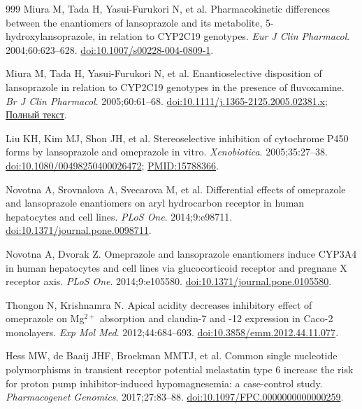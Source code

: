\documentclass[11pt,a4paper,notitlepage]{report}
\begin{document}
\begin{thebibliography}{999}
 Miura M, Tada H, Yasui-Furukori N, et al. Pharmacokinetic differences between the enantiomers of lansoprazole and its metabolite, 5-hydroxylansoprazole, in relation to CYP2C19 genotypes. \textit{Eur J Clin Pharmacol}. 2004;60:623--628. \href{https://doi.org/10.1007/s00228-004-0809-1}{doi:10.1007/s00228-004-0809-1}.

 Miura M, Tada H, Yasui-Furukori N, et al. Enantioselective disposition of lansoprazole in relation to CYP2C19 genotypes in the presence of fluvoxamine. \textit{Br J Clin Pharmacol}. 2005;60:61--68. \href{https://doi.org/10.1111/j.1365-2125.2005.02381.x}{doi:10.1111/j.1365-2125.2005.02381.x}; \href{https://pmc.ncbi.nlm.nih.gov/articles/PMC1884909/}{Полный текст}.

 Liu KH, Kim MJ, Shon JH, et al. Stereoselective inhibition of cytochrome P450 forms by lansoprazole and omeprazole in vitro. \textit{Xenobiotica}. 2005;35:27--38. \href{https://doi.org/10.1080/00498250400026472}{doi:10.1080/00498250400026472}; \href{https://pubmed.ncbi.nlm.nih.gov/15788366/}{PMID:15788366}.

 Novotna A, Srovnalova A, Svecarova M, et al. Differential effects of omeprazole and lansoprazole enantiomers on aryl hydrocarbon receptor in human hepatocytes and cell lines. \textit{PLoS One}. 2014;9:e98711. \href{https://doi.org/10.1371/journal.pone.0098711}{doi:10.1371/journal.pone.0098711}.

 Novotna A, Dvorak Z. Omeprazole and lansoprazole enantiomers induce CYP3A4 in human hepatocytes and cell lines via glucocorticoid receptor and pregnane X receptor axis. \textit{PLoS One}. 2014;9:e105580. \href{https://doi.org/10.1371/journal.pone.0105580}{doi:10.1371/journal.pone.0105580}.

 Thongon N, Krishnamra N. Apical acidity decreases inhibitory effect of omeprazole on Mg$^{2+}$ absorption and claudin-7 and -12 expression in Caco-2 monolayers. \textit{Exp Mol Med}. 2012;44:684--693. \href{https://doi.org/10.3858/emm.2012.44.11.077}{doi:10.3858/emm.2012.44.11.077}.

 Hess MW, de Baaij JHF, Broekman MMTJ, et al. Common single nucleotide polymorphisms in transient receptor potential melastatin type 6 increase the risk for proton pump inhibitor-induced hypomagnesemia: a case-control study. \textit{Pharmacogenet Genomics}. 2017;27:83--88. \href{https://doi.org/10.1097/FPC.0000000000000259}{doi:10.1097/FPC.0000000000000259}.


\end{thebibliography}
\end{document}

